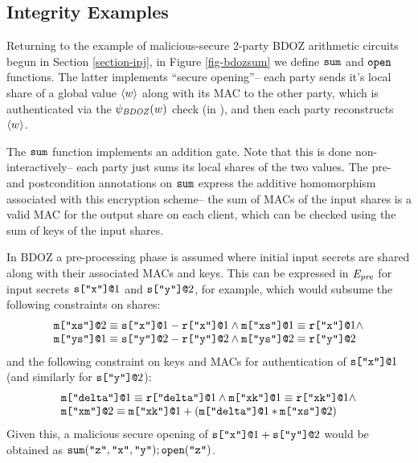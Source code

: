 \subsection{Integrity Examples}



Returning to the example of malicious-secure 2-party BDOZ arithmetic
circuits begun in Section \ref{section-ipj}, in Figure \ref{fig-bdozsum} we
define $\texttt{sum}$ and $\texttt{open}$ functions. The latter implements
``secure opening''-- each party sends it's local share of a
global value $\langle w \rangle$ along with its MAC to the other party,
which is authenticated via the $\psi_{\mathit{BDOZ}}(w)$ check (in ),
and then each party reconstructs $\langle w \rangle$. 

The $\texttt{sum}$ function implements an addition gate. Note that this
is done non-interactively-- each party just sums its local shares
of the two values. The pre- and postcondition annotations
on $\texttt{sum}$ express the additive homomorphism associated
with this encryption scheme-- the sum of MACs of the input
shares is a valid MAC for the output share on each client,
which can be checked using the sum of keys of the input shares. 

In BDOZ a pre-processing phase is assumed where initial input secrets
are shared along with their associated MACs and keys. This can be
expressed in $\mathit{E}_{\mathit{pre}}$ for input secrets $\texttt{s[}\texttt{"x"}\texttt{]}\texttt{@}1$ and
$\texttt{s[}\texttt{"y"}\texttt{]}\texttt{@}2$, for example, which would subsume the following
constraints on shares:
{\footnotesize$$
\begin{array}{l}
\texttt{m[}\texttt{"xs"}\texttt{]}\texttt{@}2 \equiv \texttt{s[}\texttt{"x"}\texttt{]}\texttt{@}1 - \texttt{r[}\texttt{"x"}\texttt{]}\texttt{@}1 \wedge 
\texttt{m[}\texttt{"xs"}\texttt{]}\texttt{@}1 \equiv \texttt{r[}\texttt{"x"}\texttt{]}\texttt{@}1 \wedge \\
\texttt{m[}\texttt{"ys"}\texttt{]}\texttt{@}1 \equiv \texttt{s[}\texttt{"y"}\texttt{]}\texttt{@}2 - \texttt{r[}\texttt{"y"}\texttt{]}\texttt{@}2 \wedge 
\texttt{m[}\texttt{"ys"}\texttt{]}\texttt{@}2 \equiv \texttt{r[}\texttt{"y"}\texttt{]}\texttt{@}2 
\end{array}
$$}
and the following constraint on keys and MACs for authentication
of $\texttt{s[}\texttt{"x"}\texttt{]}\texttt{@}1$ (and similarly for $\texttt{s[}\texttt{"y"}\texttt{]}\texttt{@}2$):
{\footnotesize$$
\begin{array}{l}
\texttt{m[}\texttt{"delta"}\texttt{]}\texttt{@}1 \equiv \texttt{r[}\texttt{"delta"}\texttt{]}\texttt{@}1 \wedge
\texttt{m[}\texttt{"xk"}\texttt{]}\texttt{@}1 \equiv \texttt{r[}\texttt{"xk"}\texttt{]}\texttt{@}1 \wedge\\
\texttt{m[}\texttt{"xm"}\texttt{]}\texttt{@}2 \equiv \texttt{m[}\texttt{"xk"}\texttt{]}\texttt{@}1 + (\texttt{m[}\texttt{"delta"}\texttt{]}\texttt{@}1 * \texttt{m[}\texttt{"xs"}\texttt{]}\texttt{@}2)
\end{array}
$$}
Given this, a malicious secure opening of $\texttt{s[}\texttt{"x"}\texttt{]}\texttt{@}1 +
\texttt{s[}\texttt{"y"}\texttt{]}\texttt{@}2$ would be obtained as
$\texttt{sum}(\texttt{"z"},\texttt{"x"},\texttt{"y"}); \texttt{open}(\texttt{"z"})$.

